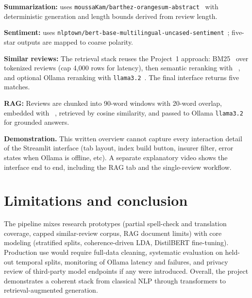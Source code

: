 \documentclass[11pt,a4paper]{article}
\begin{document}
\textbf{Summarization:} uses \texttt{moussaKam/barthez-orangesum-abstract}~\cite{ref:barthez} with deterministic generation and length bounds derived from review length.

\textbf{Sentiment:} uses \texttt{nlptown/bert-base-multilingual-uncased-sentiment}~\cite{ref:sentiment-bert}; five-star outputs are mapped to coarse polarity.

\textbf{Similar reviews:} The retrieval stack reuses the Project~1 approach: BM25~\cite{ref:bm25} over tokenized reviews (cap 4{,}000 rows for latency), then semantic reranking with ~\cite{ref:minilm-l6}, and optional Ollama reranking with \texttt{llama3.2}~\cite{ref:ollama-llama}. The final interface returns five matches.

\textbf{RAG:} Reviews are chunked into 90-word windows with 20-word overlap, embedded with ~\cite{ref:paraphrase-l12}, retrieved by cosine similarity, and passed to Ollama \texttt{llama3.2}~\cite{ref:ollama-llama} for grounded answers.

\textbf{Demonstration.} This written overview cannot capture every interaction detail of the Streamlit
interface (tab layout, index build button, insurer filter, error states when Ollama is offline, etc). A separate explanatory video shows the interface end to end, including the RAG tab and the single-review workflow.

\section{Limitations and conclusion}
The pipeline mixes research prototypes (partial spell-check and translation coverage, capped similar-review corpus, RAG document limits) with core modeling (stratified splits, coherence-driven LDA, DistilBERT fine-tuning). Production use would require full-data cleaning, systematic evaluation on held-out temporal splits, monitoring of Ollama latency and failures, and privacy review of third-party model endpoints if any were introduced. Overall, the project demonstrates a coherent stack from classical NLP through transformers to retrieval-augmented generation.
\end{document}
